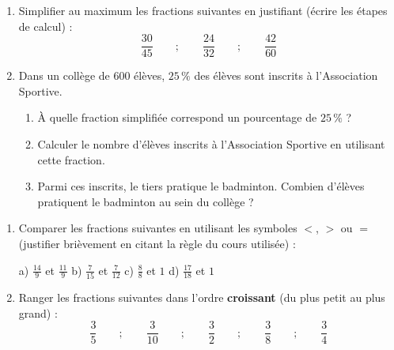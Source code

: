 \documentclass[a4paper]{book}
\begin{document}
    
    \begin{exercice}
        \begin{enumerate}
            \item Simplifier au maximum les fractions suivantes en justifiant (écrire les étapes de calcul) : 
            \[ \frac{30}{45} \qquad ; \qquad \frac{24}{32} \qquad ; \qquad \frac{42}{60} \]
            \item Dans un collège de 600 élèves, $25\,\%$ des élèves sont inscrits à l'Association Sportive.
            \begin{enumerate}
                \item À quelle fraction simplifiée correspond un pourcentage de $25\,\%$ ?
                \item Calculer le nombre d'élèves inscrits à l'Association Sportive en utilisant cette fraction.
                \item Parmi ces inscrits, le tiers pratique le badminton. Combien d'élèves pratiquent le badminton au sein du collège ?
            \end{enumerate}
        \end{enumerate}
    \end{exercice}
    
    
    \begin{exercice}
        \begin{enumerate}
            \item Comparer les fractions suivantes en utilisant les symboles $<$, $>$ ou $=$ (justifier brièvement en citant la règle du cours utilisée) :
            
            \vspace{0.2cm}
            a) $\frac{14}{9}$ et $\frac{11}{9}$ \hfill b) $\frac{7}{15}$ et $\frac{7}{12}$ \hfill c) $\frac{8}{8}$ et $1$ \hfill d) $\frac{17}{18}$ et $1$ \hfill
            
            \vspace{0.2cm}
            \item Ranger les fractions suivantes dans l'ordre \textbf{croissant} (du plus petit au plus grand) : 
            \[ \frac{3}{5} \qquad ; \qquad \frac{3}{10} \qquad ; \qquad \frac{3}{2} \qquad ; \qquad \frac{3}{8} \qquad ; \qquad \frac{3}{4} \]
        \end{enumerate}
    \end{exercice}
    
\end{document}
